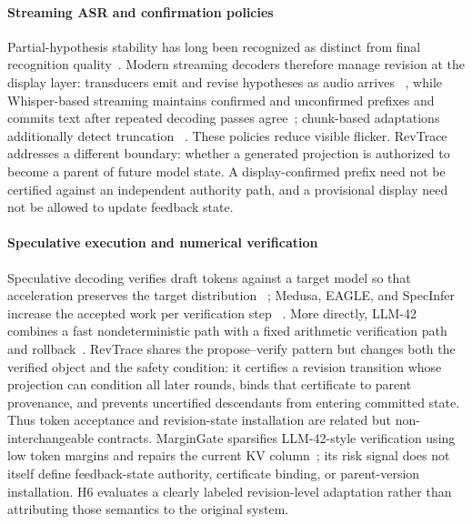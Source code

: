 
\paragraph{Streaming ASR and confirmation policies}
Partial-hypothesis stability has long been recognized as distinct from final
recognition quality~\cite{selfridge2011stability,shangguan2020stability}.
Modern streaming decoders therefore manage revision at the display layer:
transducers emit and revise hypotheses as audio arrives
~\cite{graves2012transduction}, while Whisper-based streaming maintains
confirmed and unconfirmed prefixes and commits text after repeated decoding
passes agree~\cite{machacek2023whisperstreaming,radford2023whisper};
chunk-based adaptations additionally detect truncation
~\cite{wang2024simulwhisper}. These policies reduce visible flicker. RevTrace
addresses a different boundary: whether a generated projection is authorized
to become a parent of future model state. A display-confirmed prefix need not
be certified against an independent authority path, and a provisional display
need not be allowed to update feedback state.

\paragraph{Speculative execution and numerical verification}
Speculative decoding verifies draft tokens against a target model so that
acceleration preserves the target distribution
~\cite{leviathan2023specdec,chen2023specsample}; Medusa, EAGLE, and SpecInfer
increase the accepted work per verification step
~\cite{cai2024medusa,li2024eagle,miao2024specinfer}. More directly,
LLM-42 combines a fast nondeterministic path with a fixed arithmetic
verification path and rollback~\cite{zhang2026llm42}. RevTrace shares the
propose--verify pattern but changes both the verified object and the safety
condition: it certifies a revision transition whose projection can condition
all later rounds, binds that certificate to parent provenance, and prevents
uncertified descendants from entering committed state. Thus token acceptance
and revision-state installation are related but non-interchangeable contracts.
MarginGate sparsifies LLM-42-style verification using low token margins and
repairs the current KV column~\cite{chu2026margingate}; its risk signal does
not itself define feedback-state authority, certificate binding, or
parent-version installation. H6 evaluates a clearly labeled revision-level
adaptation rather than attributing those semantics to the original system.

